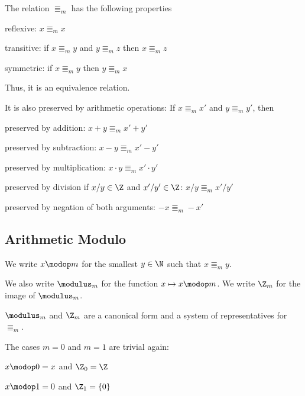 \begin{theorem}[Modulo]\label{thm:modulo}
The relation $\Equiv_m$ has the following properties
\begin{compactitem}
\item reflexive: $x\Equiv_m x$
\item transitive: if $x\Equiv_m y$ and $y\Equiv_m z$ then $x\Equiv_m z$
\item symmetric: if $x\Equiv_m y$ then $y\Equiv_m x$
\end{compactitem}
Thus, it is an equivalence relation.
\medskip

It is also preserved by arithmetic operations: If $x\Equiv_m x'$ and $y\Equiv_m y'$, then
\begin{compactitem}
\item preserved by addition: $x+y\Equiv_m x'+y'$
\item preserved by subtraction: $x-y\Equiv_m x'-y'$
\item preserved by multiplication: $x\cdot y\Equiv_m x'\cdot y'$
\item preserved by division if $x/y\in \Z$ and $x'/y'\in \Z$: $x/y\Equiv_m x'/y'$
\item preserved by negation of both arguments: $-x\Equiv_m -x'$
\end{compactitem}
\end{theorem}

\subsection{Arithmetic Modulo}\label{sec:math:moduloarith}

\begin{definition}[Modulus]\label{def:math:modulofun}
 We write $x\modop m$ for the smallest $y\in\N$ such that $x\Equiv_m y$.
 
 We also write $\modulus_m$ for the function $x\mapsto x\modop m$.
 We write $\Z_m$ for the image of $\modulus_m$.
\end{definition}

\begin{theorem}[Modulus]
$\modulus_m$ and $\Z_m$ are a canonical form and a system of representatives for $\Equiv_m$.
\end{theorem}

\begin{remark}
The cases $m=0$ and $m=1$ are trivial again:
\begin{compactitem}
\item $x\modop 0=x$ and $\Z_0=\Z$
\item $x\modop 1=0$ and $\Z_1=\{0\}$
\end{compactitem}
\end{remark}


